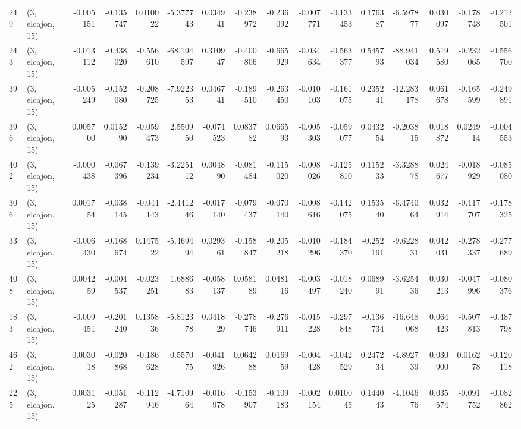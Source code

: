 \begin{tabular}{llrrrrrrrrrrrrrr}
249 &  (3, elcajon, 15) &  -0.005151 & -0.135747 &  0.010022 &   -5.377743 &  0.034941 &  -0.238972 & -0.236092 & -0.007771 & -0.133453 &  0.176387 &    -6.597877 &  0.030097 & -0.178748 & -0.212501 \\
243 &  (3, elcajon, 15) &  -0.013112 & -0.438020 & -0.556610 &  -68.194597 &  0.310947 &  -0.400806 & -0.665929 & -0.034634 & -0.563377 &  0.545793 &   -88.941034 &  0.519580 & -0.232065 & -0.556700 \\
39  &  (3, elcajon, 15) &  -0.005249 & -0.152080 & -0.208725 &   -7.922353 &  0.046741 &  -0.189510 & -0.263450 & -0.010103 & -0.161075 &  0.235241 &   -12.283178 &  0.061678 & -0.165599 & -0.249891 \\
396 &  (3, elcajon, 15) &   0.005700 &  0.015290 & -0.059473 &    2.550950 & -0.074523 &   0.083782 &  0.066593 & -0.005303 & -0.059077 &  0.043254 &    -0.203815 &  0.018872 &  0.024914 & -0.004553 \\
402 &  (3, elcajon, 15) &  -0.000438 & -0.067396 & -0.139234 &   -3.225112 &  0.004890 &  -0.081484 & -0.115020 & -0.008026 & -0.125810 &  0.115233 &    -3.328878 &  0.024677 & -0.018929 & -0.085080 \\
306 &  (3, elcajon, 15) &   0.001754 & -0.038145 & -0.044143 &   -2.441246 & -0.017140 &  -0.079437 & -0.070140 & -0.008616 & -0.142075 &  0.153540 &    -6.474064 &  0.032914 & -0.117707 & -0.178325 \\
33  &  (3, elcajon, 15) &  -0.006430 & -0.168674 &  0.147522 &   -5.469494 &  0.029361 &  -0.158847 & -0.205218 & -0.010296 & -0.184370 & -0.252191 &    -9.622831 &  0.042031 & -0.278337 & -0.277689 \\
408 &  (3, elcajon, 15) &   0.004259 & -0.004537 & -0.023251 &    1.688683 & -0.058137 &   0.058189 &  0.048116 & -0.003497 & -0.018240 &  0.068991 &    -3.625436 &  0.030213 & -0.047996 & -0.080376 \\
183 &  (3, elcajon, 15) &  -0.009451 & -0.201240 &  0.135836 &   -5.812378 &  0.041829 &  -0.278746 & -0.276911 & -0.015228 & -0.297848 & -0.136734 &   -16.648068 &  0.064423 & -0.507813 & -0.487798 \\
462 &  (3, elcajon, 15) &   0.003018 & -0.020868 & -0.186628 &    0.557075 & -0.041926 &   0.064288 &  0.016959 & -0.004428 & -0.042529 &  0.247234 &    -4.892739 &  0.030900 &  0.016278 & -0.120118 \\
225 &  (3, elcajon, 15) &   0.003125 & -0.051287 & -0.112946 &   -4.710964 & -0.016978 &  -0.153907 & -0.109183 & -0.002154 &  0.010045 &  0.144043 &    -4.104676 &  0.035574 & -0.091752 & -0.082862 \\

\end{tabular}
